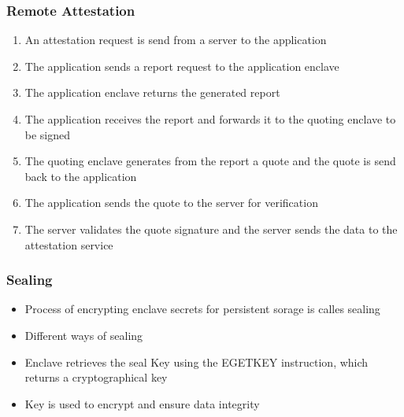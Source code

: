 \begin{frame}
    \frametitle{Remote Attestation}
    \begin{enumerate}[<+->]
        \item An attestation request is send from a server to the application
        \item The application sends a report request to the application enclave
        \item The application enclave returns the generated report
        \item The application receives the report and forwards it to the quoting enclave to be signed
        \item The quoting enclave generates from the report a quote and the quote is send back to the application
        \item The application sends the quote to the server for verification
        \item The server validates the quote signature and the server sends the data to the attestation service
    \end{enumerate}
\end{frame}


\begin{frame}
    \frametitle{Sealing}
    \begin{itemize}[<+->]
        \item Process of encrypting enclave secrets for persistent sorage is calles sealing
        \item Different ways of sealing
        \item Enclave retrieves the seal Key using the EGETKEY instruction, which returns a cryptographical key
        \item Key is used to encrypt and ensure data integrity
    \end{itemize}
\end{frame}

